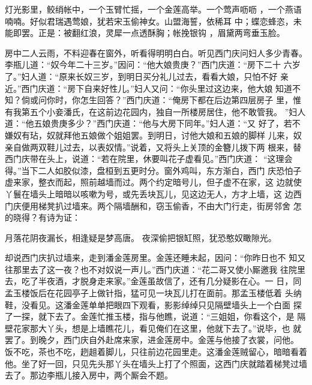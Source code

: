 灯光影里，鲛绡帐中，一个玉臂忙摇，一个金莲高举。一个莺声呖呖
，一个燕语喃喃。好似君瑞遇莺娘，犹若宋玉偷神女。山盟海誓，依稀耳
中；蝶恋蜂恣，未能即罢。正是：被翻红浪，灵犀一点透酥胸；帐挽银钩
，眉黛两弯垂玉脸。

房中二人云雨，不料迎春在窗外，听看得明明白白。听见西门庆问妇人多少青春。
李瓶儿道：“奴今年二十三岁。”因问：“他大娘贵庚？”西门庆道：“房下二十
六岁了。”妇人道：“原来长奴三岁，到明日买分礼儿过去，看看大娘，只怕不好
亲近。”西门庆道：“房下自来好性儿。”妇人又问：“你头里过这边来，他大娘
知道不知？倘或问你时，你怎生回答？”西门庆道：“俺房下都在后边第四层房子
里，惟有我第五个小妾潘氏，在这前边花园内，独自一所楼房居住，他不敢管我。
”妇人道：“他五娘贵庚多少？”西门庆道：“他与大房下同年。”妇人道：“又
好了，若不嫌奴有玷，奴就拜他五娘做个姐姐罢。到明日，讨他大娘和五娘的脚样
儿来，奴亲自做两双鞋儿过去，以表奴情。”说着，又将头上关顶的金簪儿拨下两
根来，替西门庆带在头上，说道：“若在院里，休要叫花子虚看见。”西门庆道：
“这理会得。”当下二人如胶似漆，盘桓到五更时分。窗外鸡叫，东方渐白，西门
庆恐怕子虚来家，整衣而起，照前越墙而过。两个约定暗号儿，但子虚不在家，这
边就使丫鬟在墙头上暗暗以咳嗽为号，或先丢块瓦儿，见这边无人，方才上墙，这
边西门庆便用梯凳扒过墙来。两个隔墙酬和，窃玉偷香，不由大门行走，街房邻舍
怎的晓得？有诗为证：

月落花阴夜漏长，相逢疑是梦高唐。
夜深偷把银缸照，犹恐憨奴瞰隙光。

却说西门庆扒过墙来，走到潘金莲房里。金莲还睡未起，因问：“你昨日也不
知又往那里去了这一夜？也不对奴说一声儿。”西门庆道：“花二哥又使小厮邀我
往院里去，吃了半夜酒，才脱身走来家。”金莲虽故信了，还有几分疑影在心。一
日，同孟玉楼饭后在花园亭子上做针指，猛可见一块瓦儿打在面前。那孟玉楼低着
头纳鞋，没看见。这潘金莲单单把眼四下观看，影影绰绰只见隔壁墙头上一个白面
探了一探，就下去了。金莲忙推玉楼，指与他瞧，说道：“三姐姐，你看这个，是
隔壁花家那大丫头，想是上墙瞧花儿，看见俺们在这里，他就下去了。”说毕，也
就罢了。到晚夕，西门庆自外赴席来家，进金莲房中。金莲与他接了衣裳，问他。
饭不吃，茶也不吃，趔趄着脚儿，只往前边花园里走。这潘金莲贼留心，暗暗看着
他。坐了好一回，只见先头那丫头在墙头上打了个照面，这西门庆就踏着梯凳过墙
去了。那边李瓶儿接入房中，两个厮会不题。

